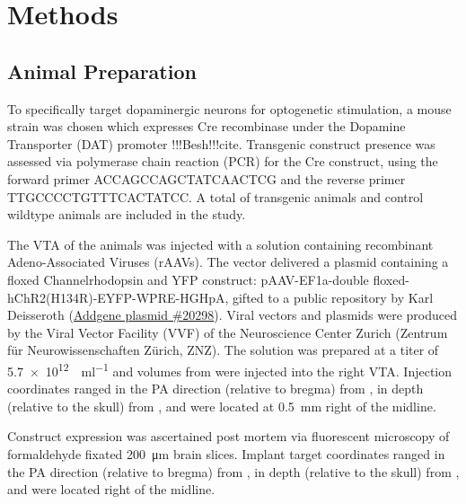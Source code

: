 \section{Methods}

\subsection{Animal Preparation}

To specifically target dopaminergic neurons for optogenetic stimulation, a mouse strain was chosen which expresses Cre recombinase under the Dopamine Transporter (DAT) promoter !!!Besh!!!cite.
Transgenic construct presence was assessed via polymerase chain reaction (PCR) for the Cre construct, using the forward primer ACCAGCCAGCTATCAACTCG and the reverse primer TTGCCCCTGTTTCACTATCC.
A total of  transgenic animals and  control wildtype animals are included in the study.

The VTA of the animals was injected with a solution containing recombinant Adeno-Associated Viruses (rAAVs).
The vector delivered a plasmid containing a floxed Channelrhodopsin and YFP construct:
pAAV-EF1a-double floxed-hChR2(H134R)-EYFP-WPRE-HGHpA, gifted to a public repository by Karl Deisseroth (\href{https://www.addgene.org/20298/}{Addgene plasmid \#20298}).
Viral vectors and plasmids were produced by the Viral Vector Facility (VVF) of the Neuroscience Center Zurich (Zentrum für Neurowissenschaften Zürich, ZNZ).
The solution was prepared at a titer of \SI{5.7e12}{\vg\per\milli\litre} and volumes from
were injected into the right VTA.
Injection coordinates ranged in the PA direction (relative to bregma) from
,
in depth (relative to the skull) from
,
and were located at \SI{0.5}{\milli\meter} right of the midline.

Construct expression was ascertained post mortem via fluorescent microscopy of formaldehyde fixated \SI{200}{\micro\metre} brain slices.
Implant target coordinates ranged in the PA direction (relative to bregma) from
,
in depth (relative to the skull) from
,
and were located
right of the midline.

